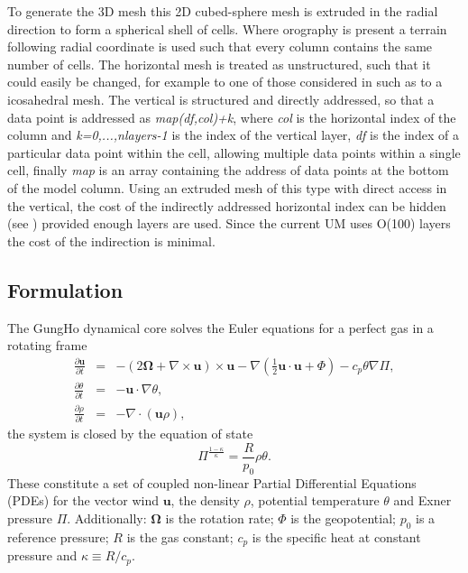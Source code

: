 \documentclass[review,times]{elsarticle}
\begin{document}
To generate the 3D mesh this 2D cubed-sphere mesh is extruded in the radial 
direction to form a spherical shell of cells. Where orography is present a terrain
following radial coordinate is used such that every column contains the
same number of cells. The horizontal mesh is treated as unstructured,
such that it could easily be changed, for example to one of those considered 
in \cite{staniforth2012} such as to a icosahedral mesh.
The vertical is structured and directly addressed, so that
a data point is addressed as \textit{map(df,col)+k}, where \textit{col}
is the horizontal index of the column and \textit{k=0,...,nlayers-1} is
the index of the vertical layer, \textit{df} is the index of a particular
data point within the cell, allowing multiple data points within a single cell, 
finally \textit{map} is an array containing the address of data points at 
the bottom of the model column.
Using an extruded mesh of this type with direct access in the vertical, the cost
of the indirectly addressed horizontal index can be hidden (see \cite{gmd-9-3803-2016})
provided enough layers are used. Since the current UM uses O(100) layers the 
cost of the indirection is minimal.
%

\subsection{Formulation\label{sec:sub:formulation}}
The GungHo dynamical core solves the Euler equations for a perfect gas in a 
rotating frame
%
\begin{eqnarray}
\frac{\partial\mathbf{u}}{\partial t} & = & -\left(2\bm{\Omega}+\nabla\times\mathbf{u}\right)\times\mathbf{u} - \nabla\left(\frac{1}{2}\mathbf{u}\cdot\mathbf{u} + \Phi\right) - c_p\theta\nabla\Pi,\label{eq:momentum}\\
\frac{\partial\theta}{\partial t} & = & - \mathbf{u}\cdot\nabla\theta,\label{eq:energy}\\
\frac{\partial\rho}{\partial t} & = & - \nabla\cdot\left(\mathbf{u}\rho\right)\label{eq:continuity},
\end{eqnarray}
%
the system is closed by the equation of state
%
\begin{equation}
\Pi^{\frac{1-\kappa}{\kappa}} = \frac{R}{p_0}\rho\theta.\label{eq:eos}
\end{equation}
%
These constitute a set of coupled non-linear Partial Differential
Equations (PDEs) for the vector wind $\mathbf{u}$, 
the density $\rho$, potential temperature $\theta$ and Exner pressure $\Pi$. 
Additionally: $\bm{\Omega}$ is the rotation rate; $\Phi$ is the geopotential; 
$p_0$ is a reference pressure; $R$ is the gas constant; $c_p$ is the specific 
heat at constant pressure and $\kappa\equiv R/c_p$.
\end{document}
